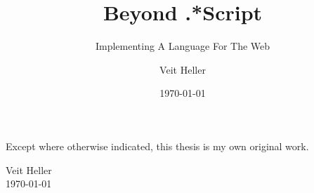 \documentclass[oneside,11pt,xetex]{scrbook}
\begin{document}
\title{Beyond .*Script}
\subtitle{Implementing A Language For The Web}

\author{Veit Heller}

\date{\today}

\publishers{%
  \normalsize{%
  A thesis submitted for the degree of \\
  B.Sc. of Applied Computer Science of \\
  The University of Applied Sciences Berlin}}

\uppertitleback{%
  \textbf{Institutional Address}\\
  HTW Berlin\\
  Campus Treskowallee\\
  Treskowallee 8\\
  10318 Berlin\\
  \textsc{Germany}\\
  \bigskip\\
  \textbf{Supervisory Panel}\\

  Prof. Hendrik Gärtner\\
  HTW Berlin\\

  Prof. Henrick Lochmann\\
  HTW Berlin\\
  \bigskip\\
  Set with the help of {\KOMAScript} and
  \XeLaTeX.\\

  \copyright~\the\year. All rights reserved.}

\dedication{\small{\emph{For Meredith, Tobias and all the people who cope with me. Your undying support will not be forgotten.}}}

\maketitle

\frontmatter

\vspace*{0.4\textheight}

\begin{center}
  Except where otherwise indicated, this thesis is my own original
  work.
\end{center}
\vspace*{4cm}

\begin{flushright}
  \begin{minipage}{4cm}
    Veit Heller\\
    \today
  \end{minipage}
\end{flushright}
\end{document}
